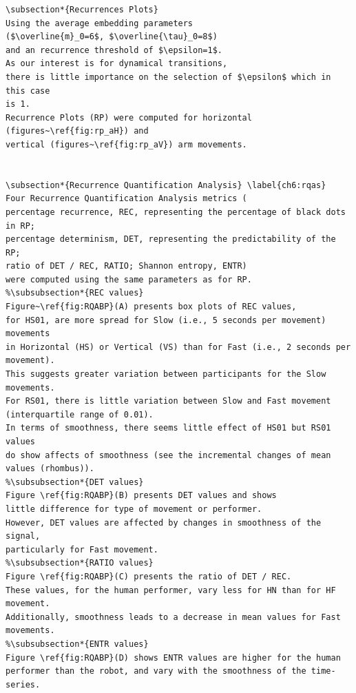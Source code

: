 \documentclass[10pt]{article}
\begin{document}
\begin{verbatim}
\subsection*{Recurrences Plots}
Using the average embedding parameters 
($\overline{m}_0=6$, $\overline{\tau}_0=8$) 
and an recurrence threshold of $\epsilon=1$.
As our interest is for dynamical transitions, 
there is little importance on the selection of $\epsilon$ which in this case
is 1. 
Recurrence Plots (RP) were computed for horizontal (figures~\ref{fig:rp_aH}) and 
vertical (figures~\ref{fig:rp_aV}) arm movements.


\subsection*{Recurrence Quantification Analysis} \label{ch6:rqas}
Four Recurrence Quantification Analysis metrics (
percentage recurrence, REC, representing the percentage of black dots in RP; 
percentage determinism, DET, representing the predictability of the RP; 
ratio of DET / REC, RATIO; Shannon entropy, ENTR) 
were computed using the same parameters as for RP.
%\subsubsection*{REC values}
Figure~\ref{fig:RQABP}(A) presents box plots of REC values, 
for HS01, are more spread for Slow (i.e., 5 seconds per movement) movements 
in Horizontal (HS) or Vertical (VS) than for Fast (i.e., 2 seconds per movement).  
This suggests greater variation between participants for the Slow movements.  
For RS01, there is little variation between Slow and Fast movement
(interquartile range of 0.01). 
In terms of smoothness, there seems little effect of HS01 but RS01 values 
do show affects of smoothness (see the incremental changes of mean values (rhombus)).
%\subsubsection*{DET values}
Figure \ref{fig:RQABP}(B) presents DET values and shows 
little difference for type of movement or performer.  
However, DET values are affected by changes in smoothness of the signal, 
particularly for Fast movement.
%\subsubsection*{RATIO values}
Figure \ref{fig:RQABP}(C) presents the ratio of DET / REC. 
These values, for the human performer, vary less for HN than for HF movement.  
Additionally, smoothness leads to a decrease in mean values for Fast movements.
%\subsubsection*{ENTR values}
Figure \ref{fig:RQABP}(D) shows ENTR values are higher for the human 
performer than the robot, and vary with the smoothness of the time-series.


\end{verbatim}
\end{document}
